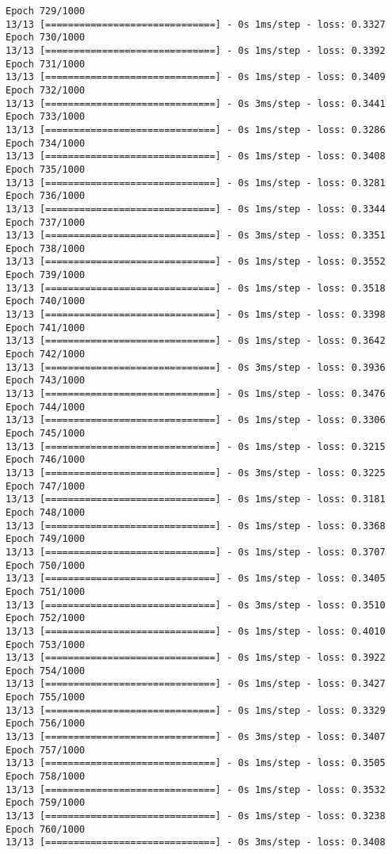 \documentclass[11pt]{article}
\begin{document}
\begin{Verbatim}[commandchars=\\\{\}]
Epoch 729/1000
13/13 [==============================] - 0s 1ms/step - loss: 0.3327
Epoch 730/1000
13/13 [==============================] - 0s 1ms/step - loss: 0.3392
Epoch 731/1000
13/13 [==============================] - 0s 1ms/step - loss: 0.3409
Epoch 732/1000
13/13 [==============================] - 0s 3ms/step - loss: 0.3441
Epoch 733/1000
13/13 [==============================] - 0s 1ms/step - loss: 0.3286
Epoch 734/1000
13/13 [==============================] - 0s 1ms/step - loss: 0.3408
Epoch 735/1000
13/13 [==============================] - 0s 1ms/step - loss: 0.3281
Epoch 736/1000
13/13 [==============================] - 0s 1ms/step - loss: 0.3344
Epoch 737/1000
13/13 [==============================] - 0s 3ms/step - loss: 0.3351
Epoch 738/1000
13/13 [==============================] - 0s 1ms/step - loss: 0.3552
Epoch 739/1000
13/13 [==============================] - 0s 1ms/step - loss: 0.3518
Epoch 740/1000
13/13 [==============================] - 0s 1ms/step - loss: 0.3398
Epoch 741/1000
13/13 [==============================] - 0s 1ms/step - loss: 0.3642
Epoch 742/1000
13/13 [==============================] - 0s 3ms/step - loss: 0.3936
Epoch 743/1000
13/13 [==============================] - 0s 1ms/step - loss: 0.3476
Epoch 744/1000
13/13 [==============================] - 0s 1ms/step - loss: 0.3306
Epoch 745/1000
13/13 [==============================] - 0s 1ms/step - loss: 0.3215
Epoch 746/1000
13/13 [==============================] - 0s 3ms/step - loss: 0.3225
Epoch 747/1000
13/13 [==============================] - 0s 1ms/step - loss: 0.3181
Epoch 748/1000
13/13 [==============================] - 0s 1ms/step - loss: 0.3368
Epoch 749/1000
13/13 [==============================] - 0s 1ms/step - loss: 0.3707
Epoch 750/1000
13/13 [==============================] - 0s 1ms/step - loss: 0.3405
Epoch 751/1000
13/13 [==============================] - 0s 3ms/step - loss: 0.3510
Epoch 752/1000
13/13 [==============================] - 0s 1ms/step - loss: 0.4010
Epoch 753/1000
13/13 [==============================] - 0s 1ms/step - loss: 0.3922
Epoch 754/1000
13/13 [==============================] - 0s 1ms/step - loss: 0.3427
Epoch 755/1000
13/13 [==============================] - 0s 1ms/step - loss: 0.3329
Epoch 756/1000
13/13 [==============================] - 0s 3ms/step - loss: 0.3407
Epoch 757/1000
13/13 [==============================] - 0s 1ms/step - loss: 0.3505
Epoch 758/1000
13/13 [==============================] - 0s 1ms/step - loss: 0.3532
Epoch 759/1000
13/13 [==============================] - 0s 1ms/step - loss: 0.3238
Epoch 760/1000
13/13 [==============================] - 0s 3ms/step - loss: 0.3408

\end{Verbatim}
\end{document}
